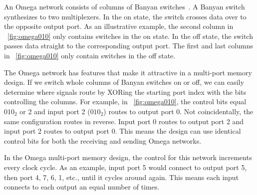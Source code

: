     An Omega network consists of columns of Banyan switches~\cite{prelim:wu,prelim:lawrie}. A Banyan switch synthesizes to two multiplexers. In the on state, the switch crosses data over to the opposite output port. As an illustrative example, the second column in \figurename~\ref{fig:omega010} only contains switches in the on state. In the off state, the switch passes data straight to the corresponding output port. The first and last columns in \figurename~\ref{fig:omega010} only contain switches in the off state.

The Omega network has features that make it attractive in a multi-port memory design. If we switch whole columns of Banyan switches on or off, we can easily determine where signals route by XORing the starting port index with the bits controlling the columns. For example, in \figurename~\ref{fig:omega010}, the control bits equal $010_2$ or 2 and input port 2 ($010_2$) routes to output port 0. Not coincidentally, the same configuration routes in reverse. Input port 0 routes to output port 2 and input port 2 routes to output port 0. This means the design can use identical control bits for both the receiving and sending Omega networks.

In the Omega multi-port memory design, the control for this network increments every clock cycle. As an example, input port 5 would connect to output port 5, then port 4, 7, 6, 1, etc., until it cycles around again. This means each input connects to each output an equal number of times.

